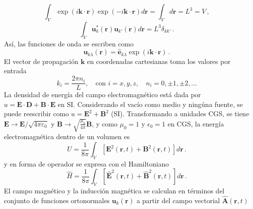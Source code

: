\begin{equation}
  \int_V \exp{(i\mathbf{k}\cdot\mathbf{r})} \exp{(-i\mathbf{k}\cdot\mathbf{r})} d\mathbf{r}
  =  \int_V d\mathbf{r}
  =  L^3 = V \,,
\end{equation}
\begin{equation}
  \label{EM.14}
  \int_V \mathbf{u}^{*}_k(\mathbf{r}) \mathbf{u}_{k'}(\mathbf{r}) d\mathbf{r} = L^3\delta_{kk'} \,.
\end{equation}
Así, las funciones de onda se escriben como
\begin{equation}
  \label{EM.15}
  \mathbf{u}_{k\lambda}(\mathbf{r}) = \mathbf{\hat{e}}_{k\lambda} \exp\left({i\mathbf{k}\cdot \mathbf{r}}\right) \,.
\end{equation}
El vector de propagación $\mathbf{k}$ en coordenadas cartesianas toma los valores por entrada
\begin{equation}
  \label{EM.16}
  k_i = \frac{2\pi n_i}{L}, \quad \text{con } i=x,y,z , \quad n_i = 0, \pm1, \pm 2, \dots
\end{equation}
La densidad de energía del campo electromagnético está dada por $u = \mathbf{E} \cdot \mathbf{D} + \mathbf{B} \cdot \mathbf{E}$ en SI. Considerando el vacío como medio y ningúna fuente, se puede reescribir como $u = \mathbf{E}^2 + \mathbf{B}^2$ (SI). Transformando a unidades CGS, se tiene $\mathbf{E} \to \mathbf{E}/\sqrt{4\pi \varepsilon_0}$ y $\mathbf{B} \to \sqrt{\frac{\mu_0}{4\pi}}\mathbf{B}$, y como $\mu_0=1$ y $\epsilon_0 = 1$ en CGS, la energía electromagnética dentro de un volumen es
\begin{equation}
  \label{EM.17}
  U = \frac{1}{8\pi}\int_V \left[ \mathbf{E}^2(\mathbf{r}, t) + \mathbf{B}^2(\mathbf{r}, t) \right] d\mathbf{r} \,.
\end{equation}
y en forma de operador se expresa con el Hamiltoniano
\begin{equation}
  \label{EM.17H}
  \hat{H} = \frac{1}{8\pi}\int_V \left[ \hat{\mathbf{E}}^2(\mathbf{r}, t) + \hat{\mathbf{B}}^2(\mathbf{r}, t) \right] d\mathbf{r} \,.
\end{equation}
El campo magnético y la inducción magnética se calculan en términos del conjunto de funciones ortonormales $\mathbf{u}_k(\mathbf{r})$ a partir del campo vectorial $\hat{\mathbf{A}}(\mathbf{r}, t)$
